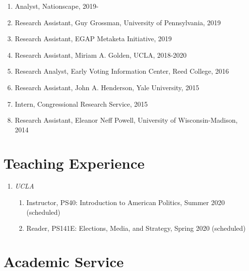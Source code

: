 \documentclass[12pt]{article}
\begin{document}
\begin{enumerate}[topsep = 0pt, itemsep = 1ex, partopsep  = 1ex, parsep = 1ex]

	\item[] Analyst, Nationscape, 2019-

	\item[] Research Assistant, Guy Grossman, University of Pennsylvania, 2019
	
	\item[] Research Assistant, EGAP Metaketa Initiative, 2019
	
	\item[] Research Assistant, Miriam A. Golden, UCLA, 2018-2020
	
	\item[] Research Analyst, Early Voting Information Center, Reed College, 2016
	
	\item[] Research Assistant, John A. Henderson, Yale University, 2015
	
	\item[] Intern, Congressional Research Service, 2015
	
	\item[] Research Assistant, Eleanor Neff Powell, University of Wisconsin-Madison, 2014
	
\end{enumerate}

\section*{Teaching Experience}

\begin{enumerate}[topsep = 0pt, itemsep = -1ex, partopsep  = 1ex, parsep = 1ex]
	
	\item[] \textit{UCLA}
	
	\begin{enumerate}[topsep = 0pt, itemsep = -1ex, partopsep = -1ex, parsep = 1ex]
		
		\item[] Instructor, PS40: Introduction to American Politics, Summer 2020 (scheduled)
		\item[] Reader, PS141E: Elections, Media, and Strategy, Spring 2020 (scheduled)
		
	\end{enumerate}

\end{enumerate}

\section*{Academic Service} 
\end{document}
